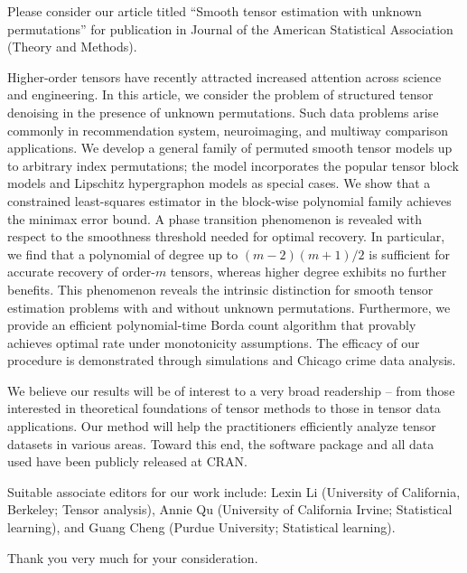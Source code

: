 \documentclass{article}
\begin{document}
Please consider our article titled ``Smooth tensor estimation with unknown permutations'' for publication in Journal of the American Statistical Association (Theory and Methods). 

Higher-order tensors have recently attracted increased attention across science and engineering. In this article, we consider the problem of structured tensor denoising in the presence of unknown permutations. Such data problems arise commonly in recommendation system, neuroimaging, and multiway comparison applications. We develop a general family of permuted smooth tensor models up to arbitrary index permutations; the model incorporates the popular tensor block models and Lipschitz hypergraphon models as special cases.  We show that a constrained least-squares estimator in the block-wise polynomial family achieves the minimax error bound. A phase transition phenomenon is revealed with respect to the smoothness threshold needed for optimal recovery. In particular, we find that a polynomial of degree up to $(m -2)(m + 1)/2$ is sufficient for accurate recovery of order-$m$ tensors, whereas higher degree exhibits no further benefits. This phenomenon reveals the intrinsic distinction for smooth tensor estimation problems with and without unknown permutations. Furthermore, we provide an efficient polynomial-time Borda count algorithm that provably achieves optimal rate under monotonicity assumptions. The efficacy of our procedure is demonstrated through simulations and Chicago crime data analysis.


We believe our results will be of interest to a very broad readership -- from those interested in theoretical foundations of tensor methods to those in tensor data applications. Our method will help the practitioners efficiently analyze tensor datasets in various areas. Toward this end, the software package and all data used have been publicly released at CRAN. 

Suitable associate editors for our work include: Lexin Li (University of California, Berkeley; Tensor analysis), Annie Qu (University of California Irvine; Statistical learning), and Guang Cheng (Purdue University; Statistical learning).

Thank you very much for your consideration.
\end{document}
